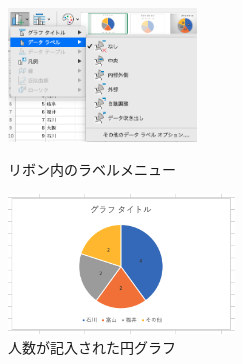 \begin{figure}[tb]
    \begin{minipage}{0.5\hsize}
        \centering
        \includegraphics[width=5cm]{chap2/piechart_label_menu.png}
        \caption{リボン内のラベルメニュー}
        \label{fig:piechart_menu}
    \end{minipage}
    \begin{minipage}{0.5\hsize}
        \centering
        \includegraphics[width=6cm]{chap2/piechart_labeled.png}
        \caption{人数が記入された円グラフ}
        \label{fig:piechart_labeled}
    \end{minipage}
\end{figure}


